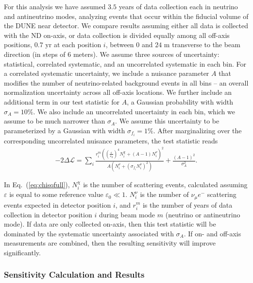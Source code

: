 For this analysis we have assumed $3.5$ years of data collection each in neutrino and antineutrino modes, analyzing events that occur within the fiducial volume of the DUNE near detector. We compare results assuming either all data is collected with the ND on-axis, or data collection is divided equally among all off-axis positions, $0.7$ yr at each position  $i$, between $0$ and $24$ m transverse to the beam direction (in steps of 6 meters).
We assume three sources of uncertainty: statistical, correlated systematic, and an uncorrelated systematic in each bin. 
For a correlated systematic uncertainty, we include a nuisance parameter $A$ that modifies the number of neutrino-related background events in all bins -- an overall normalization uncertainty across all off-axis locations. 
We further include an additional term in our test statistic for $A$, a  Gaussian probability with width $\sigma_A = 10\%$. 
We also include an uncorrelated uncertainty in each bin, which we assume to be much narrower than $\sigma_A$. 
We assume this uncertainty to be parameterized by a Gaussian with width $\sigma_{f_i} = 1\%$. 
After marginalizing over the corresponding uncorrelated nuisance parameters, the test statistic reads
\begin{eqnarray}\label{eq:chisqfull}
-2\Delta \mathcal{L} = \sum_i \frac{r_i^m\left( \left(\frac{\varepsilon}{\varepsilon_0}\right)^4 N_i^\chi + (A-1)N_i^\nu\right)^2}{A\left(N_i^\nu + (\sigma_{f_i} N_i^\nu)^2 \right)} + \frac{\left(A-1\right)^2}{\sigma_A^2}.
\end{eqnarray}



In Eq.~(\ref{eq:chisqfull}), $N_i^\chi$ is the number of  scattering events, calculated assuming $\varepsilon$ is equal to some reference value $\varepsilon_0 \ll 1$. $N_i^\nu$ is the number of $\nu_\mu e^-$ scattering events expected in detector position $i$, and $r_i^m$ is the number of years of data collection in detector position $i$ during beam mode $m$ (neutrino or antineutrino mode). If data are only collected on-axis, then this test statistic will be dominated by the systematic uncertainty associated with $\sigma_A$. If on- and off-axis measurements are combined, then the resulting sensitivity will improve significantly.

\subsubsection{Sensitivity Calculation and Results}

